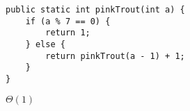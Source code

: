 \question
\begin{lstlisting}
public static int pinkTrout(int a) {
    if (a % 7 == 0) {
        return 1;
    } else {
        return pinkTrout(a - 1) + 1;
    }
}
\end{lstlisting}

\begin{solution}[0.25in]
$\Theta(1)$
\end{solution}